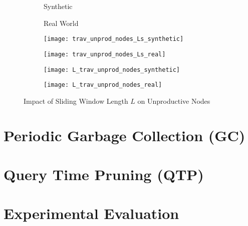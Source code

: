 \documentclass[abstracton,12pt]{scrartcl}
\theoremstyle{definition}
\begin{document}
\begin{figure}[h]
  \centering
  \begin{subfigure}{0.49\linewidth}
    \centering
    Synthetic
  \end{subfigure}
  \begin{subfigure}{0.49\linewidth}
    \centering
    Real World
  \end{subfigure}
  \begin{subfigure}{0.49\linewidth}
    \centering
    \texttt{[image: trav\_unprod\_nodes\_Ls\_synthetic]}
    \caption{}
    \label{fig:trav_unprod_nodes_Ls_synthetic}
  \end{subfigure}
  \begin{subfigure}{0.49\linewidth}
    \centering
    \texttt{[image: trav\_unprod\_nodes\_Ls\_real]}
    \caption{}
    \label{fig:trav_unprod_nodes_Ls_real}
  \end{subfigure}
  \begin{subfigure}{0.49\linewidth}
    \centering
    \texttt{[image: L\_trav\_unprod\_nodes\_synthetic]}
    \caption{}
    \label{fig:L_trav_unprod_nodes_synthetic}
  \end{subfigure}
  \begin{subfigure}{0.49\linewidth}
    \centering
    \texttt{[image: L\_trav\_unprod\_nodes\_real]}
    \caption{}
    \label{fig:L_trav_unprod_nodes_real}
  \end{subfigure}
  \caption{Impact of Sliding Window Length $L$ on Unproductive Nodes}
\end{figure}

\section{Periodic Garbage Collection (GC)}

\section{Query Time Pruning (QTP)}

\section{Experimental Evaluation}






\newpage



\end{document}
